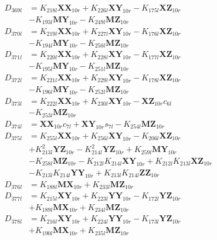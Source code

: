 \begin{align}
D_{369l} &= K_{218l}\mathbf{XX}_{10r} + K_{226l}\mathbf{XY}_{10r} - K_{175l}\mathbf{XZ}_{10r}  \nonumber \\
&- K_{193l}\mathbf{MY}_{10r} - K_{249l}\mathbf{MZ}_{10r} \nonumber \\
D_{370l} &= K_{219l}\mathbf{XX}_{10r} + K_{227l}\mathbf{XY}_{10r} - K_{176l}\mathbf{XZ}_{10r}  \nonumber \\
&- K_{194l}\mathbf{MY}_{10r} - K_{250l}\mathbf{MZ}_{10r} \nonumber \\
D_{371l} &= K_{220l}\mathbf{XX}_{10r} + K_{228l}\mathbf{XY}_{10r} - K_{177l}\mathbf{XZ}_{10r}  \nonumber \\
&- K_{195l}\mathbf{MY}_{10r} - K_{251l}\mathbf{MZ}_{10r} \nonumber \\
D_{372l} &= K_{221l}\mathbf{XX}_{10r} + K_{229l}\mathbf{XY}_{10r} - K_{178l}\mathbf{XZ}_{10r}  \nonumber \\
&- K_{196l}\mathbf{MY}_{10r} - K_{252l}\mathbf{MZ}_{10r} \nonumber \\
D_{373l} &= K_{222l}\mathbf{XX}_{10r} + K_{230l}\mathbf{XY}_{10r} - \mathbf{XZ}_{10r}c_{6l}  \nonumber \\
&- K_{253l}\mathbf{MZ}_{10r} \nonumber \\
D_{374l} &= \mathbf{XX}_{10r}c_{7l} + \mathbf{XY}_{10r}s_{7l} - K_{254l}\mathbf{MZ}_{10r} \nonumber \\
D_{375l} &= K_{255l}\mathbf{XX}_{10r} + K_{256l}\mathbf{XY}_{10r} - K_{206l}\mathbf{XZ}_{10r}  \nonumber \\
&+ K_{213l}^2\mathbf{YZ}_{10r} - K_{214l}^2\mathbf{YZ}_{10r} + K_{259l}\mathbf{MY}_{10r}  \nonumber \\
&- K_{258l}\mathbf{MZ}_{10r} - K_{212l}K_{214l}\mathbf{XY}_{10r} + K_{212l}K_{213l}\mathbf{XZ}_{10r}  \nonumber \\
&- K_{213l}K_{214l}\mathbf{YY}_{10r} + K_{213l}K_{214l}\mathbf{ZZ}_{10r} \nonumber \\
D_{376l} &= K_{188l}\mathbf{MX}_{10r} + K_{233l}\mathbf{MZ}_{10r} \nonumber \\
D_{377l} &= K_{215l}\mathbf{XY}_{10r} + K_{223l}\mathbf{YY}_{10r} - K_{172l}\mathbf{YZ}_{10r}  \nonumber \\
&+ K_{189l}\mathbf{MX}_{10r} + K_{234l}\mathbf{MZ}_{10r} \nonumber \\
D_{378l} &= K_{216l}\mathbf{XY}_{10r} + K_{224l}\mathbf{YY}_{10r} - K_{173l}\mathbf{YZ}_{10r}  \nonumber \\
&+ K_{190l}\mathbf{MX}_{10r} + K_{235l}\mathbf{MZ}_{10r} \nonumber \\

\end{align}
